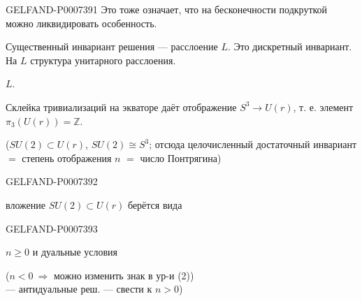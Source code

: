 \begin{GelfandAdjacentEvidence}{GELFAND-P000739}{1}
Это тоже означает, что на бесконечности подкруткой можно ликвидировать особенность.

Существенный инвариант решения --- расслоение \(L\). Это дискретный инвариант. На \(L\) структура унитарного расслоения.

 \(L\).

Склейка тривиализаций на экваторе даёт отображение \(S^3\to U(r)\), т. е. элемент \(\pi_3(U(r))=\mathbb Z\).

(\(SU(2)\subset U(r)\), \(SU(2)\cong S^3\); отсюда целочисленный достаточный инвариант
\(=\) степень отображения \(n\) \(=\) число Понтрягина)
\end{GelfandAdjacentEvidence}
\begin{GelfandAdjacentEvidence}{GELFAND-P000739}{2}


вложение \(SU(2)\subset U(r)\) берётся вида
\end{GelfandAdjacentEvidence}
\begin{GelfandAdjacentEvidence}{GELFAND-P000739}{3}


 \(n\geq0\) и дуальные условия

(\(n<0\ \Rightarrow\) можно изменить знак в ур-и (2))\\
\hspace*{2em}--- антидуальные реш. --- свести к \(n>0\))
\end{GelfandAdjacentEvidence}
